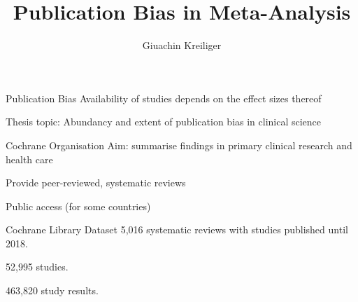 \documentclass[english]{beamer}\usepackage[]{graphicx}\usepackage[]{color}
\title{Publication Bias in Meta-Analysis}%
\author{Giuachin Kreiliger}
\begin{document}
\maketitle

% 
% 

\begin{frame}{Publication Bias}
Availability of studies depends on the effect sizes thereof

Thesis topic: Abundancy and extent of publication bias in clinical science
\end{frame}

\begin{frame}{Cochrane Organisation}
Aim: summarise findings in primary clinical research and health care

Provide peer-reviewed, systematic reviews

Public access (for some countries)
\end{frame}


\begin{frame}{Cochrane Library Dataset}
5,016 systematic reviews with studies published until 2018.

52,995 studies.

463,820 study results.
\end{frame}
\end{document}

